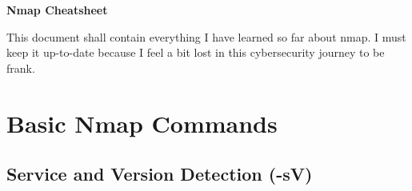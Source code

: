 \documentclass[11pt,a4paper]{article}
\begin{document}
\begin{center}
    \begin{tcolorbox}[width=\textwidth, colback=sectioncolor!20, colframe=sectioncolor]
        \centering
        {\Huge \textbf{Nmap Cheatsheet}}\\[0.5em]
    \end{tcolorbox}
\end{center}

\tableofcontents
\clearpage

\vspace{1em}
\begin{tcolorbox}[colback=codebackground, colframe=warningcolor]
    This document shall contain everything I have learned so far about nmap. I must keep it up-to-date because I feel a bit lost in this cybersecurity journey to be frank.
\end{tcolorbox}

\section{Basic Nmap Commands}

\subsection{Service and Version Detection (-sV)}
\end{document}
